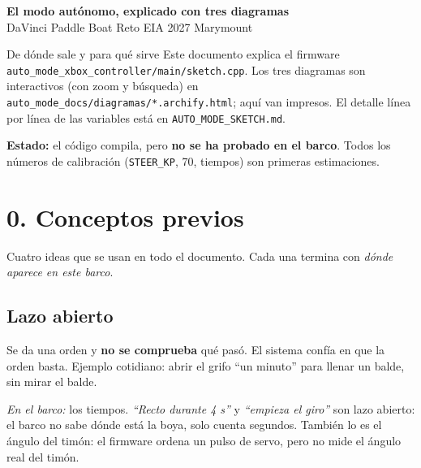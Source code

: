 \documentclass[11pt,a4paper]{article}
\newcommand{\cod}[1]{\texttt{#1}}
\begin{document}
\begin{center}
{\LARGE\bfseries El modo aut\'onomo, explicado con tres diagramas}\\[1.5mm]
{\small DaVinci Paddle Boat \textperiodcentered{} Reto EIA 2027 \textperiodcentered{} Marymount}
\end{center}

\begin{nota}{De d\'onde sale y para qu\'e sirve}
Este documento explica el firmware \cod{auto\_mode\_xbox\_controller/main/sketch.cpp}. Los
tres diagramas son interactivos (con zoom y b\'usqueda) en
\cod{auto\_mode\_docs/diagramas/*.archify.html}; aqu\'i van impresos. El detalle l\'inea por
l\'inea de las variables est\'a en \cod{AUTO\_MODE\_SKETCH.md}.

\textbf{Estado:} el c\'odigo compila, pero \textbf{no se ha probado en el barco}. Todos los
n\'umeros de calibraci\'on (\cod{STEER\_KP}, 70\textdegree, tiempos) son primeras
estimaciones.
\end{nota}

\section*{0. Conceptos previos}

Cuatro ideas que se usan en todo el documento. Cada una termina con \emph{d\'onde aparece en
este barco}.

\subsection*{Lazo abierto}
Se da una orden y \textbf{no se comprueba} qu\'e pas\'o. El sistema conf\'ia en que la orden basta.
Ejemplo cotidiano: abrir el grifo ``un minuto'' para llenar un balde, sin mirar el balde.

\begin{center}
\end{center}

\emph{En el barco:} los tiempos. \emph{``Recto durante 4 s''} y \emph{``empieza el giro''} son lazo abierto:
el barco no sabe d\'onde est\'a la boya, solo cuenta segundos. Tambi\'en lo es el \'angulo del tim\'on: el
firmware ordena un pulso de servo, pero no mide el \'angulo real del tim\'on.
\end{document}

